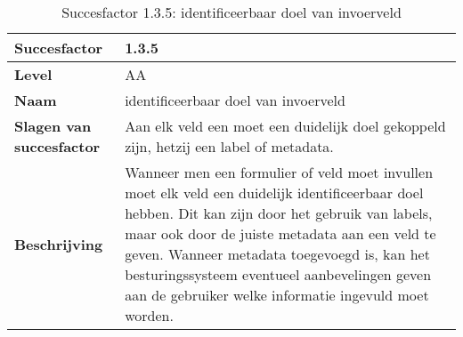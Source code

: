 \newpage
\begin{table}[H]
    \centering
    \caption{Succesfactor 1.3.5: identificeerbaar doel van invoerveld}
    \hspace*{-1cm}\begin{tabular}{|l|p{12cm}|} 
        \hline
        \textbf{Succesfactor}                 & 1.3.5                                                                                                                                                                                                                                                                                                                                                                                                                                                                                                            \\ 
        \hline
        \textbf{Level}                        & AA                                                                                                                                                                                                                                                                                                                                                                                                                                                                                                                 \\ 
        \hline
        \textbf{Naam}                         & identificeerbaar doel van invoerveld~                                                                                                                                                                                                                                                                                                                                                                                                                                                                                      \\ 
        \hline
        \textbf{Slagen van succesfactor}      & Aan elk veld een moet een duidelijk doel gekoppeld zijn, hetzij een label of metadata.                                                                                                                                                                                                                                                                                             \\ 
        \hline
        \textbf{Beschrijving}                 & Wanneer men een formulier of veld moet invullen moet elk veld een duidelijk identificeerbaar doel hebben. Dit kan zijn door het gebruik van labels, maar ook door de juiste metadata aan een veld te geven. Wanneer metadata toegevoegd is, kan het besturingssysteem eventueel aanbevelingen geven aan de gebruiker welke informatie ingevuld moet worden. \\ 

\end{tabular}
\end{table}
